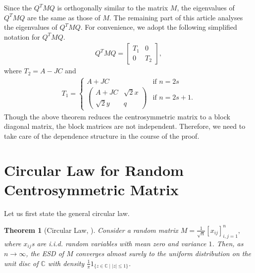 \documentclass[12pt]{amsart}
\theoremstyle{plain}
\newtheorem{Thm}{Theorem}[section]
\theoremstyle{definition}
\begin{document}
Since the $Q^{T}MQ$ is orthogonally similar to the matrix $M$, the eigenvalues of $Q^{T}MQ$ are the same as those of $M$. The remaining part of this article analyses the eigenvalues of $Q^{T}MQ$. For convenience, we adopt the following simplified notation for $Q^{T}MQ$.
\begin{align*}
    Q^{T}MQ = \left[\begin{array}{cc}
        T_{1} & 0 \\
        0 & T_{2}
    \end{array}\right],
\end{align*}
where $T_{2}=A-JC$ and 
\begin{align*}
    T_{1}=\left\{
    \begin{array}{ll}
        A+JC & \text{if $n=2s$} \\
        \left(\begin{array}{cc}
            A+JC & \sqrt{2}x \\
            \sqrt{2}y & q
        \end{array}\right) & \text{if $n=2s+1$}.
    \end{array}\right.
\end{align*}
Though the above theorem reduces the centrosymmetric matrix to a block diagonal matrix, the block matrices are not independent. Therefore, we need to take care of the dependence structure in the course of the proof.



\section{Circular Law for Random Centrosymmetric Matrix}\label{sec:circular law proof}
Let us first state the general circular law.

\setcounter{Thm}{0}
\renewcommand\theThm{\arabic{section}.\arabic{Thm}}


\begin{Thm}[Circular Law, \cite{tao2008random}]\label{GenCL}
   Consider a random matrix $M = \frac{1}{\sqrt{n}}[x_{ij}]_{i,j=1}^{n},$ where $x_{ij}$s are i.i.d. random variables with mean zero and variance $1$. Then, as $n\to\infty$, the ESD of $M$ converges almost surely to the uniform distribution on the unit disc of $\mathbb{C}$ with density $\frac{1}{\pi} 1_{\{ z\in \mathbb{C} \;|\; |z|\leq1\}}$.
\end{Thm}
\end{document}
